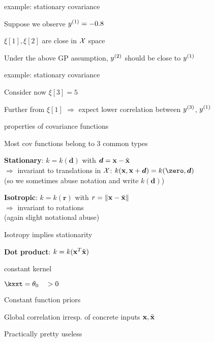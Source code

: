 \documentclass[11pt,compress,t,notes=noshow, xcolor=table]{beamer}
\begin{document}
\begin{framei}{example: stationary covariance}
\item Suppose we observe $\yi[1] = -0.8$
\item $\xi[1], \xi[2]$ are close in $\Xspace$ space
\item Under the above GP assumption, $\yi[2]$ should be close to $\yi[1]$ 
\vfill
{}
\end{framei}

\begin{framei}{example: stationary covariance}
\item Consider now $\xi[3] = 5$
\item Further from $\xi[1]$ $\Rightarrow$ expect lower correlation between $\yi[3]$, $\yi[1]$ 
\vfill
{}
\end{framei}

\begin{framei}[sep=L]{properties of covariance functions}
\item Most cov functions belong to 3 common types
\item \textbf{Stationary}: $k = k(\bm{d})$ with $\bm{d} = \xv - \xtil$ \\
$\Rightarrow$ invariant to translations in $\Xspace$: $k(\xv, \xv + \bm{d}) = k(\zero, \bm{d})$\\
(so we sometimes abuse notation and write $k(\bm{d})$)
\item \textbf{Isotropic}: $k = k(\bm{r})$ with $r = \xxtnorm$ \\
$\Rightarrow$ invariant to rotations\\
(again slight notational abuse)
\item Isotropy implies stationarity
\item \textbf{Dot product}: $k = k(\xv^T \xtil)$
\end{framei}

\begin{framei}{constant kernel}
\item $\kxxt = \theta_0 \quad > 0$
\item Constant function priors
\item Global correlation irresp. of concrete inputs $\xv, \xtil$
\item Practically pretty useless
\vfill
{}
\end{framei}
\end{document}
